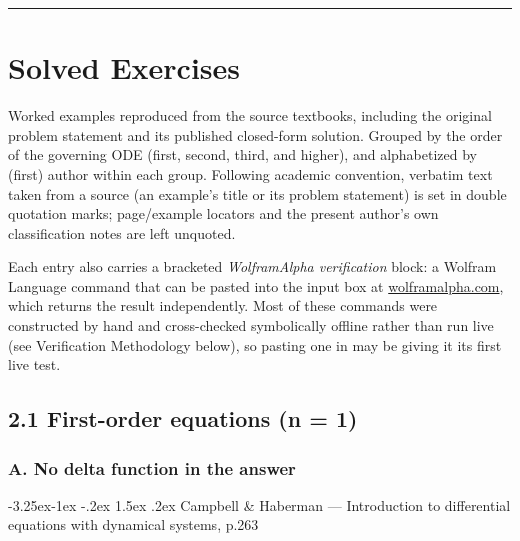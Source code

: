 \documentclass[
  11pt,
]{article}
\makeatletter
\renewcommand\paragraph{\@startsection{paragraph}{4}{\z@}%
                                     {-3.25ex\@plus -1ex \@minus -.2ex}%
                                     {1.5ex \@plus .2ex}%
                                     {\normalfont\normalsize\bfseries}}
\makeatother
\begin{document}
\begin{center}\rule{0.5\linewidth}{0.5pt}\end{center}

\hypertarget{solved-exercises}{%
\section{Solved Exercises}\label{solved-exercises}}

Worked examples reproduced from the source textbooks, including the
original problem statement and its published closed-form solution.
Grouped by the order of the governing ODE (first, second, third, and
higher), and alphabetized by (first) author within each group. Following
academic convention, verbatim text taken from a source (an example's
title or its problem statement) is set in double quotation marks;
page/example locators and the present author's own classification notes
are left unquoted.

Each entry also carries a bracketed \emph{WolframAlpha verification}
block: a Wolfram Language command that can be pasted into the input box
at \href{https://www.wolframalpha.com}{wolframalpha.com}, which returns
the result independently. Most of these commands were constructed by
hand and cross-checked symbolically offline rather than run live (see
Verification Methodology below), so pasting one in may be giving it its
first live test.

\hypertarget{first-order-equations}{%
\subsection{2.1 First-order equations (n =
1)}\label{first-order-equations}}

\hypertarget{first-order-a-no-delta}{%
\subsubsection{A. No delta function in the
answer}\label{first-order-a-no-delta}}

\hypertarget{campbell-haberman-introduction-to-differential-equations-with-dynamical-systems-p.263}{%
\paragraph{Campbell \& Haberman --- Introduction to differential
equations with dynamical systems,
p.263}\label{campbell-haberman-introduction-to-differential-equations-with-dynamical-systems-p.263}}
\end{document}
